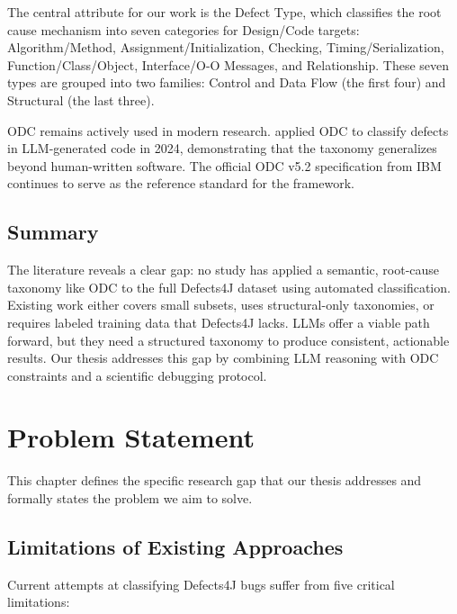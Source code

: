 \documentclass{iutbscthesis}
\begin{document}
The central attribute for our work is the Defect Type, which classifies the root cause mechanism into seven categories for Design/Code targets: Algorithm/Method, Assignment/Initialization, Checking, Timing/Serialization, Function/Class/Object, Interface/O-O Messages, and Relationship. These seven types are grouped into two families: Control and Data Flow (the first four) and Structural (the last three).

ODC remains actively used in modern research. \textcite{pan2024understanding} applied ODC to classify defects in LLM-generated code in 2024, demonstrating that the taxonomy generalizes beyond human-written software. The official ODC v5.2 specification from IBM \cite{ibm2013odc} continues to serve as the reference standard for the framework.

\section{Summary}

The literature reveals a clear gap: no study has applied a semantic, root-cause taxonomy like ODC to the full Defects4J dataset using automated classification. Existing work either covers small subsets, uses structural-only taxonomies, or requires labeled training data that Defects4J lacks. LLMs offer a viable path forward, but they need a structured taxonomy to produce consistent, actionable results. Our thesis addresses this gap by combining LLM reasoning with ODC constraints and a scientific debugging protocol.


\chapter{Problem Statement}

This chapter defines the specific research gap that our thesis addresses and formally states the problem we aim to solve.

\section{Limitations of Existing Approaches}

Current attempts at classifying Defects4J bugs suffer from five critical limitations:
\end{document}
